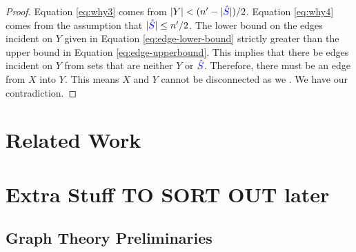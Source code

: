 \documentclass[11pt]{article}
\begin{document}
\begin{proof}
Equation \eqref{eq:why3} comes from  $|Y| < (n' - |\textcolor{blue}{\hat{S}}|)/2$.
Equation \eqref{eq:why4} comes from the assumption that $|\textcolor{blue}{\hat{S}}| \leq n'/2$.
The lower bound on the edges incident on $Y$ given in Equation \eqref{eq:edge-lower-bound} strictly greater than the upper bound in Equation \eqref{eq:edge-upperbound}.
This implies that there  be edges incident on $Y$ from sets that are neither $Y$ or $\textcolor{blue}{\hat{S}}$.
Therefore, there must be an edge from $X$ into $Y$.
This means $X$ and $Y$ cannot be disconnected as we .
We have our contradiction.

\end{proof}

\section{Related Work}
\label{sec:related-work}






\clearpage
\appendix
\section{Extra Stuff TO SORT OUT later}
\subsection{Graph Theory Preliminaries}


	
\end{document}
